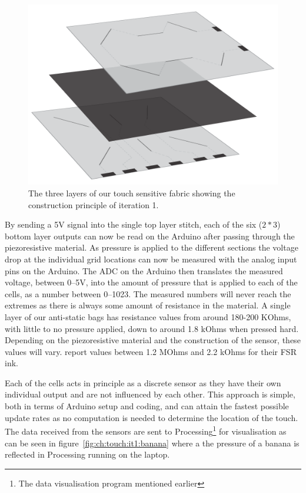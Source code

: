 \begin{figure}[b]
  \centering
  \begin{minipage}[b]{.8\textwidth}
    \centering
    \includegraphics[width=.7\linewidth]{figures/touch/layers_it_1}
    \caption{The three layers of our touch sensitive fabric showing the construction principle of iteration 1.}
    \label{layers_iteration1}
  \end{minipage}
\end{figure}

By sending a 5V signal into the single top layer stitch, each of the six (\(2*3\)) bottom layer outputs can now be read on the Arduino after passing through the piezoresistive material.  
As pressure is applied to the different sections the voltage drop at the individual grid locations can now be measured with the analog input pins on the Arduino.
The ADC on the Arduino then translates the measured voltage, between 0--5V, into the amount of pressure that is applied to each of the cells, as a number between 0--1023.
The measured numbers will never reach the extremes as there is always some amount of resistance in the material.
A single layer of our anti-static bags has resistance values from around 180-200 KOhms, with little to no pressure applied, down to around 1.8 kOhms when pressed hard.
Depending on the piezoresistive material and the construction of the sensor, these values will vary.
\citet{rosenberg2009unmousepad} report values between 1.2 MOhms and 2.2 kOhms for their FSR ink.

Each of the cells acts in principle as a discrete sensor as they have their own individual output and are not influenced by each other.
This approach is simple, both in terms of Arduino setup and coding, and can attain the fastest possible update rates as no computation is needed to determine the location of the touch. 
The data received from the sensors are sent to Processing\footnote{The data visualisation program mentioned earlier} for visualisation as can be seen in figure~\ref{fig:ch:touch:it1:banana} where a the pressure of a banana is reflected in Processing running on the laptop.

